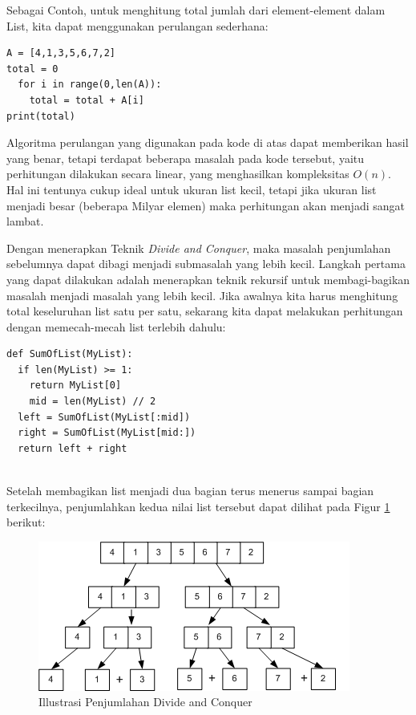 \documentclass[12pt]{book}%
\begin{document}
Sebagai Contoh, untuk menghitung total jumlah dari element-element dalam List, kita dapat menggunakan perulangan sederhana:



\lstset{language=Python}
\label{lst:SimpleSum}
\begin{lstlisting}[frame=single]
A = [4,1,3,5,6,7,2]
total = 0
  for i in range(0,len(A)):
    total = total + A[i]
print(total)
\end{lstlisting}

Algoritma perulangan yang digunakan pada kode di atas dapat memberikan hasil yang benar, tetapi terdapat beberapa masalah pada kode tersebut, yaitu perhitungan dilakukan secara linear, yang menghasilkan kompleksitas $O(n)$. Hal ini tentunya cukup ideal untuk ukuran list kecil, tetapi jika ukuran list menjadi besar (beberapa Milyar elemen) maka perhitungan akan menjadi sangat lambat.

Dengan menerapkan Teknik \textit{Divide and Conquer}, maka masalah penjumlahan sebelumnya dapat dibagi menjadi submasalah yang lebih kecil. Langkah pertama yang dapat dilakukan adalah menerapkan teknik rekursif untuk membagi-bagikan masalah menjadi masalah yang lebih kecil. Jika awalnya kita harus menghitung total keseluruhan list satu per satu, sekarang kita dapat melakukan perhitungan dengan memecah-mecah list terlebih dahulu:

\lstset{language=Python}
\label{lst:DivideAndConquerSum}
\begin{lstlisting}[frame=single]
def SumOfList(MyList):
  if len(MyList) >= 1:
    return MyList[0] 
	mid = len(MyList) // 2
  left = SumOfList(MyList[:mid])
  right = SumOfList(MyList[mid:])
  return left + right
	
\end{lstlisting}

Setelah membagikan list menjadi dua bagian terus menerus sampai bagian terkecilnya, penjumlahkan kedua nilai list tersebut dapat dilihat pada Figur \ref{fig:DivideAndConquerSum} berikut:

\begin{figure}[htbp]
\begin{center}
	\includegraphics[scale=0.7]{fig/sunario-3/Sum.png}%
	\caption{Illustrasi Penjumlahan Divide and Conquer}%
	\label{fig:DivideAndConquerSum}%
\end{center}
\end{figure}
\end{document}
